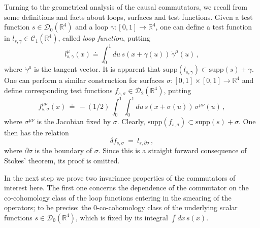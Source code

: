 \documentclass[11pt]{article}
\numberwithin{equation}{section}
\newcommand{\RR}{{\mathbb R}}
\newcommand{\Cc}{{\mathcal{C}}}
\newcommand{\Dc}{{\mathcal{D}}}
\newcommand{\supp}{{\mathrm{supp}}}
\begin{document}
Turning to the geometrical analysis of the causal commutators, 
we recall from \cite[Sect.~3]{BuCiRuVa2} some definitions 
and facts about loops, surfaces and test functions.
%
%
Given a test function $s \in \Dc_0(\RR^4)$ and a 
loop $\gamma : [0,1] \to \RR^4$, one can define 
a test function in $l_{s,\gamma} \in \Cc_1(\RR^4)$, 
called \emph{loop function}, putting 
%
$$
l_{s,\gamma}^\mu(x) \doteq \int_0^1 \! du \, s( x + \gamma(u) ) \, 
\dot{\gamma}^\mu(u) \, ,
$$
%
where $\dot{\gamma}^\mu$ is the tangent vector. It is apparent that 
$\supp(l_{s,\gamma}) \subset \supp(s) + \gamma$. One can perform 
a similar construction for surfaces 
$\sigma : [0,1] \times [0,1] \rightarrow \RR^4$ and define
corresponding test functions $f_{s,\sigma} \in \Dc_2(\RR^4)$, putting 
%
$$
f_{s,\sigma}^{\mu\nu}(x) \, \doteq \, 
- (1/2) \, \int_0^1 \! \! \int_0^1 \! du \, s( x + \sigma(u) ) \, 
\sigma^{\mu\nu}(u) \, ,
$$
where $\sigma^{\mu\nu}$ is the Jacobian fixed by $\sigma$. 
Clearly, $\supp(f_{s,\sigma}) \subset \supp(s) + \sigma$.
One then has the relation 
%
\begin{equation}
\label{eq.coStokes}
\delta f_{s,\sigma} \ = \ l_{s,\partial \sigma} \, ,
\end{equation}
%
where $\partial \sigma$ is the boundary of $\sigma$. 
Since this is a straight forward consequence of Stokes' theorem,
its proof is omitted.

\medskip
In the next step we prove two invariance properties
of the commutators of interest here. 
The first one concerns the dependence of the commutator
on the co-cohomology class of the loop functions 
entering in the smearing of the operators; to be precise:  
the 0-co-cohomology class of the underlying scalar functions
$s \in \Dc_0(\RR^4)$, which is fixed by 
its integral $\int \! dx \, s(x)$. 
\end{document}
